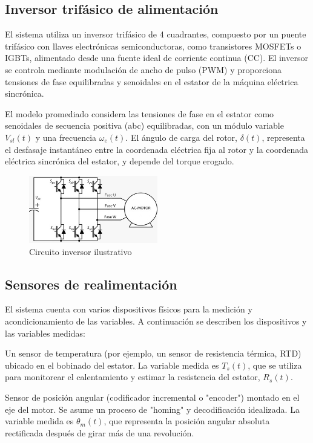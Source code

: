 \documentclass{article}
\begin{document}
\subsection{Inversor trifásico de alimentación}

El sistema utiliza un inversor trifásico de 4 cuadrantes, compuesto por un puente trifásico con llaves 
electrónicas semiconductoras, como transistores MOSFETs o IGBTs, alimentado desde una fuente ideal de 
corriente continua (CC). El inversor se controla mediante modulación de ancho de pulso (PWM) y proporciona 
tensiones de fase equilibradas y senoidales en el estator de la máquina eléctrica sincrónica.

El modelo promediado considera las tensiones de fase en el estator como senoidales de secuencia positiva 
(abc) equilibradas, con un módulo variable $V_{sl}(t)$ y una frecuencia $\omega_e(t)$. El ángulo de carga del rotor, 
$\delta (t)$, representa el desfasaje instantáneo entre la coordenada eléctrica fija al rotor y la coordenada 
eléctrica sincrónica del estator, y depende del torque erogado.

\begin{figure}[H]
    \centering
    \includegraphics[width=0.5\textwidth]{Alan7.jpg}
    \caption{Circuito inversor ilustrativo}
\end{figure}

\subsection{Sensores de realimentación}

El sistema cuenta con varios dispositivos físicos para la medición y acondicionamiento de las variables. A 
continuación se describen los dispositivos y las variables medidas:

Un sensor de temperatura (por ejemplo, un sensor de resistencia térmica, RTD) ubicado en el bobinado del 
estator. La variable medida es $T_s(t)$, que se utiliza para monitorear el calentamiento y estimar la 
resistencia del estator, $R_s(t)$.

Sensor de posición angular (codificador incremental o "encoder") montado en el eje del motor. Se asume un 
proceso de "homing" y decodificación idealizada. La variable medida es $\theta_m(t)$, que representa la posición 
angular absoluta rectificada después de girar más de una revolución. 
\end{document}
